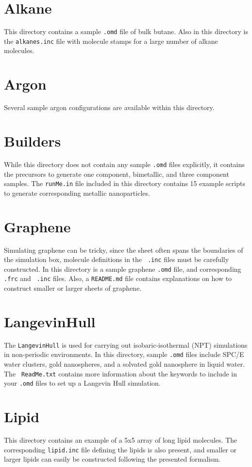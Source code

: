 \documentclass[letterpaper]{report}
\begin{document}
\section{Alkane}
This directory contains a sample {\tt .omd} file of bulk butane. Also
in this directory is the {\tt alkanes.inc} file with molecule stamps
for a large number of alkane molecules.

\section{Argon}
Several sample argon configurations are available within this
directory.

\section{Builders}
While this directory does not contain any sample {\tt .omd} files
explicitly, it contains the precursors to generate one component,
bimetallic, and three component samples. The {\tt runMe.in} file
included in this directory contains 15 example scripts to generate
corresponding metallic nanoparticles.

\section{Graphene}
Simulating graphene can be tricky, since the sheet often spans the
boundaries of the simulation box, molecule definitions in the {\tt
  .inc} files must be carefully constructed. In this directory is a
sample graphene {\tt .omd} file, and corresponding {\tt .frc} and {\tt
  .inc} files. Also, a {\tt README.md} file contains explanations on
how to construct smaller or larger sheets of graphene.

\section{LangevinHull}
The {\tt LangevinHull} is used for carrying out isobaric-isothermal
(NPT) simulations in non-periodic environments. In this directory,
sample {\tt .omd} files include SPC/E water clusters, gold
nanospheres, and a solvated gold nanosphere in liquid water. The {\tt
  ReadMe.txt} contains more information about the keywords to include
in your {\tt .omd} files to set up a Langevin Hull simulation.

\section{Lipid}
This directory contains an example of a 5x5 array of long lipid
molecules. The corresponding {\tt lipid.inc} file defining the lipids
is also present, and smaller or larger lipids can easily be
constructed following the presented formalism. 
\end{document}

